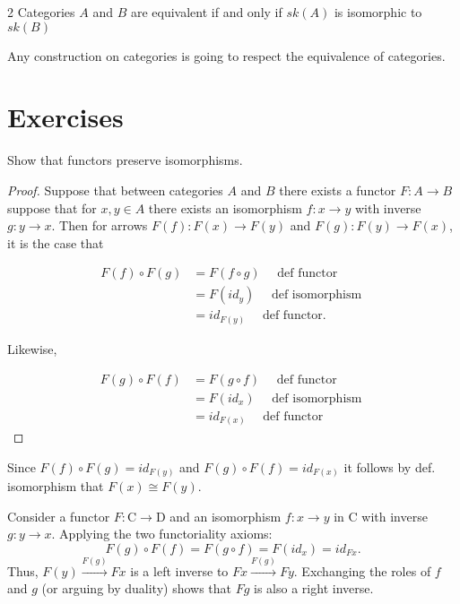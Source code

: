 \begin{adefinition}
    2 Categories $A$ and $B$ are equivalent if and only if $sk(A)$ is isomorphic to $sk(B)$
\end{adefinition}
\begin{theorem}
    Any construction on categories is going to respect the equivalence of categories.
\end{theorem}

\section{Exercises}
\begin{Exercise}
    Show that functors preserve isomorphisms.

    \begin{proof}
    Suppose that between categories $A$ and $B$ there exists a functor $F: A \rightarrow B$ suppose that for $x,y \in A$ there exists an isomorphism $f: x \rightarrow y$ with inverse $g: y \rightarrow x$. Then for arrows $F(f): F(x) \rightarrow F(y)$ and $F(g): F(y) \rightarrow F(x)$, it is the case that

    \begin{align*}
       F(f)\circ F(g) &= F(f\circ g) \quad \text{ def functor} \\ &= F(id_y) \quad \text{ def isomorphism } \\
        &= id_{F(y)} \quad \text{ def functor}.
    \end{align*}

    Likewise, 

    \begin{align*}
       F(g)\circ F(f) &= F(g\circ f) \quad \text{ def functor} \\ &= F(id_x) \quad \text{ def isomorphism } \\
        &= id_{F(x)} \quad \text{ def functor} 
    \end{align*}
    \end{proof}

    Since $F(f)\circ F(g) = id_{F(y)} $ and $F(g)\circ F(f) = id_{F(x)}$ it follows by def. isomorphism that $F(x) \cong F(y)$. 
\end{Exercise}


\begin{Answer}
    Consider a functor $F: \mathrm{C} \rightarrow \mathrm{D}$ and an isomorphism $f: x \rightarrow y$ in $\mathrm{C}$ with inverse $g: y \rightarrow x$. Applying the two functoriality axioms:
$$
F(g) \circ F(f)=F(g \circ f)=F\left(id_x\right)=id_{F x} .
$$
Thus, $ F (y) \xrightarrow{F (g)} F x$ is a left inverse to $ F x \xrightarrow{F (g)} F y$. Exchanging the roles of $f$ and $g$ (or arguing by duality) shows that $F g$ is also a right inverse.
\end{Answer}




